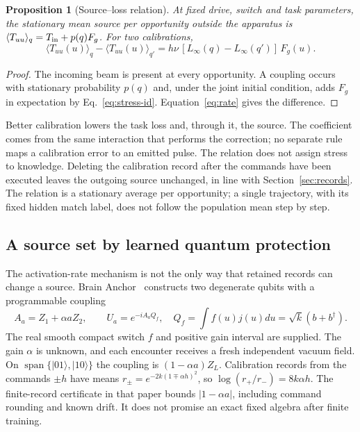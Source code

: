 \documentclass[12pt,a4paper]{article}
\newtheorem{proposition}[theorem]{Proposition}
\begin{document}
\begin{proposition}[Source--loss relation]
\label{prop:source-loss}
At fixed drive, switch and task parameters, the stationary mean source per opportunity outside the apparatus is $\langle T_{uu}\rangle_q=T_{\rm in}+p(q)F_g$. For two calibrations,
\begin{equation}
\langle T_{uu}(u)\rangle_q-\langle T_{uu}(u)\rangle_{q'}=h\nu\,[L_\infty(q)-L_\infty(q')]\,F_g(u).
\label{eq:source-loss}
\end{equation}
\end{proposition}

\begin{proof}
The incoming beam is present at every opportunity. A coupling occurs with stationary probability $p(q)$ and, under the joint initial condition, adds $F_g$ in expectation by Eq.~\eqref{eq:stress-id}. Equation~\eqref{eq:rate} gives the difference.
\end{proof}

Better calibration lowers the task loss and, through it, the source. The coefficient comes from the same interaction that performs the correction; no separate rule maps a calibration error to an emitted pulse. The relation does not assign stress to knowledge. Deleting the calibration record after the commands have been executed leaves the outgoing source unchanged, in line with Section~\ref{sec:records}. The relation is a stationary average per opportunity; a single trajectory, with its fixed hidden match label, does not follow the population mean step by step.

\subsection{A source set by learned quantum protection}
\label{sec:learned-protection-source}

The activation-rate mechanism is not the only way that retained records can
change a source. Brain Anchor~\cite{BrainAnchor} constructs two degenerate
qubits with a programmable coupling
\begin{equation}
 A_a=Z_1+\alpha aZ_2,\qquad
 U_a=e^{-iA_aQ_f},\quad
 Q_f=\int f(u)j(u)du=\sqrt{k}(b+b^\dagger).
 \label{eq:protection-coupling}
\end{equation}
The real smooth compact switch $f$ and positive gain interval are supplied.
The gain $\alpha$ is unknown, and each encounter receives a fresh independent
vacuum field. On $\operatorname{span}\{|01\rangle,|10\rangle\}$ the
coupling is $(1-\alpha a)Z_L$. Calibration records from the commands $\pm h$
have means $r_\pm=e^{-2k(1\mp\alpha h)^2}$, so
$\log(r_+/r_-)=8k\alpha h$. The finite-record certificate in that paper
bounds $|1-\alpha a|$, including command rounding and known drift.
It does not promise an exact fixed algebra after finite training.
\end{document}
